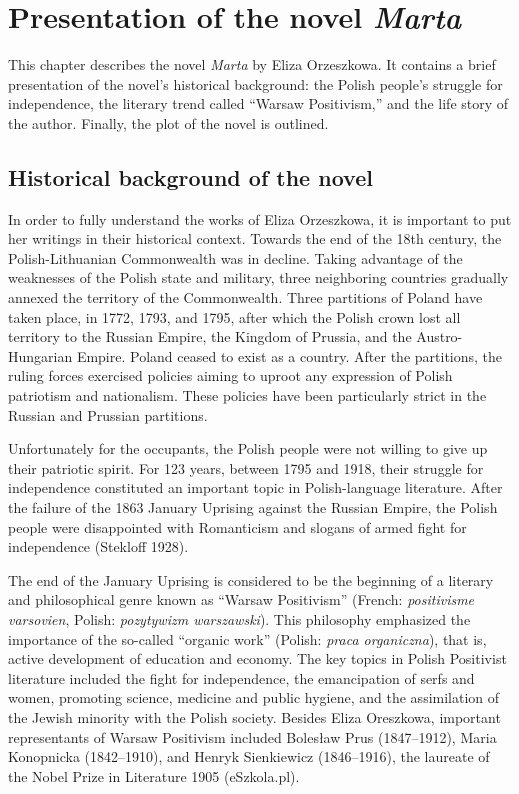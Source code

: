 \chapter{Presentation of the novel \textit{Marta}}
This chapter describes the novel \textit{Marta} by Eliza Orzeszkowa.
It contains a brief presentation of the novel's historical background: the Polish people's struggle for independence, the literary trend called ``Warsaw Positivism,'' and the life story of the author.
Finally, the plot of the novel is outlined.

\section{Historical background of the novel}

In order to fully understand the works of Eliza Orzeszkowa, it is important to put her writings in their historical context.
Towards the end of the 18th century, the Polish-Lithuanian Commonwealth was in decline.
Taking advantage of the weaknesses of the Polish state and military, three neighboring countries gradually annexed the territory of the Commonwealth.
Three partitions of Poland have taken place, in 1772, 1793, and 1795, after which the Polish crown lost all territory to the Russian Empire, the Kingdom of Prussia, and the Austro-Hungarian Empire. Poland ceased to exist as a country.
After the partitions, the ruling forces exercised policies aiming to uproot any expression of Polish patriotism and nationalism.
These policies have been particularly strict in the Russian and Prussian partitions.

Unfortunately for the occupants, the Polish people were not willing to give up their patriotic spirit.
For 123 years, between 1795 and 1918, their struggle for independence constituted an important topic in Polish-language literature.
After the failure of the 1863 January Uprising against the Russian Empire, the Polish people were disappointed with Romanticism and slogans of armed fight for independence
(Stekloff 1928).

The end of the January Uprising is considered to be the beginning of a literary and philosophical genre known as ``Warsaw Positivism'' (French: \textit{positivisme varsovien}, Polish: \textit{pozytywizm warszawski}).
This philosophy emphasized the importance of the so-called ``organic work'' (Polish: \textit{praca organiczna}), that is, active development of education and economy.
The key topics in Polish Positivist literature included the fight for independence, the emancipation of serfs and women, promoting science, medicine and public hygiene, and the assimilation of the Jewish minority with the Polish society.
Besides Eliza Oreszkowa, important representants of Warsaw Positivism included Bolesław Prus (1847--1912), Maria Konopnicka (1842--1910), and Henryk Sienkiewicz (1846--1916), the laureate of the Nobel Prize in Literature 1905
(eSzkola.pl).

